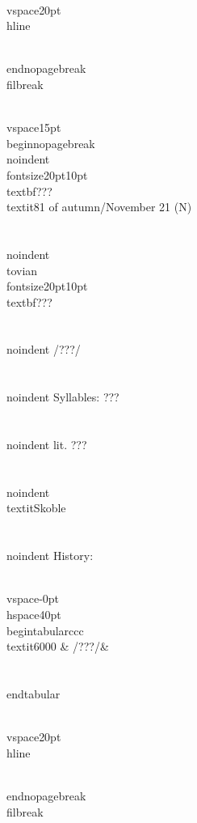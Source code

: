 \\vspace{20pt}\\hline

\\end{nopagebreak}
\\filbreak



\\vspace{15pt}
\\begin{nopagebreak}
\\noindent{\\fontsize{20pt}{10pt}\\textbf{???} } \\textit{81 of autumn/November 21} (N)\\\\
\\noindent {\\tovian \\fontsize{20pt}{10pt} \\textbf{???} }\\\\
\\noindent /???/\\\\
\\noindent Syllables: ???\\\\
\\noindent lit. ???\\\\
\\noindent \\textit{Skoble}\\\\


\\noindent History:

\\vspace{-0pt}
\\hspace{40pt}
\\begin{tabular}{ccc}
\\textit{6000} & /???/& \\\\
\\end{tabular}

\\vspace{20pt}\\hline

\\end{nopagebreak}
\\filbreak



